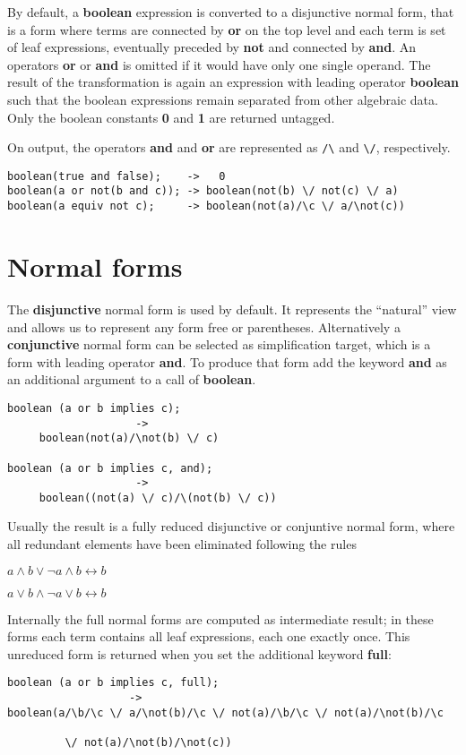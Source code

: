 By default, a {\bf boolean} expression is converted  to a
disjunctive normal form, that is a form where terms are connected
by {\bf or} on the top level and each term is set of leaf
expressions, eventually preceded by {\bf not} and connected
by  {\bf and}. An operators {\bf or} or {\bf and} is omitted
if it would have only one single operand. The result of
the transformation is again an expression with leading 
operator {\bf boolean} such that the boolean expressions
remain separated from other algebraic data. Only the boolean
constants {\bf 0} and {\bf 1} are returned untagged.

On output, the
operators {\bf and} and {\bf or} are represented as
\verb+/\+ and \verb+\/+, respectively.
\begin{verbatim}
boolean(true and false);    ->   0
boolean(a or not(b and c)); -> boolean(not(b) \/ not(c) \/ a)
boolean(a equiv not c);     -> boolean(not(a)/\c \/ a/\not(c))
\end{verbatim}

\section{Normal forms}

The {\bf disjunctive} normal form is used by default. It
represents the ``natural'' view and allows us to represent
any form free or parentheses.
Alternatively a {\bf conjunctive} normal form can be
selected as simplification target, which is a form with
leading operator {\bf and}. To produce that form add the keyword  {\bf and}
as an additional argument to a call of {\bf boolean}.
\begin{verbatim}
boolean (a or b implies c); 
                    -> 
     boolean(not(a)/\not(b) \/ c)

boolean (a or b implies c, and); 
                    ->
     boolean((not(a) \/ c)/\(not(b) \/ c))
\end{verbatim}

Usually the result is a fully reduced disjunctive or conjuntive normal
form, where all redundant elements have been eliminated following the
rules

$ a \wedge b \vee \neg a \wedge b \longleftrightarrow b$

$ a \vee b \wedge \neg a \vee b \longleftrightarrow b$
 

Internally the full normal forms are computed
as intermediate result; in these forms each term contains
all leaf expressions, each one exactly once. This unreduced form is returned 
when you set the additional keyword {\bf full}:
\begin{verbatim}
boolean (a or b implies c, full);
                   ->
boolean(a/\b/\c \/ a/\not(b)/\c \/ not(a)/\b/\c \/ not(a)/\not(b)/\c

         \/ not(a)/\not(b)/\not(c))
\end{verbatim}

